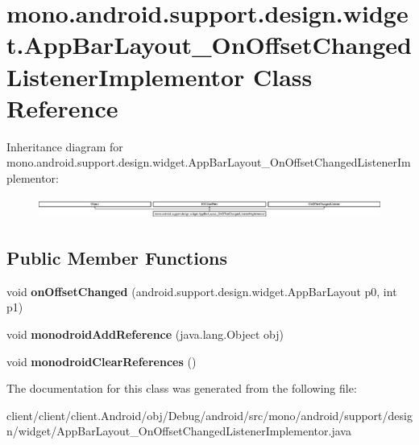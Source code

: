 \hypertarget{classmono_1_1android_1_1support_1_1design_1_1widget_1_1AppBarLayout__OnOffsetChangedListenerImplementor}{}\section{mono.\+android.\+support.\+design.\+widget.\+App\+Bar\+Layout\+\_\+\+On\+Offset\+Changed\+Listener\+Implementor Class Reference}
\label{classmono_1_1android_1_1support_1_1design_1_1widget_1_1AppBarLayout__OnOffsetChangedListenerImplementor}
Inheritance diagram for mono.\+android.\+support.\+design.\+widget.\+App\+Bar\+Layout\+\_\+\+On\+Offset\+Changed\+Listener\+Implementor\+:\begin{figure}[H]
\begin{center}
\leavevmode
\includegraphics[height=0.704403cm]{classmono_1_1android_1_1support_1_1design_1_1widget_1_1AppBarLayout__OnOffsetChangedListenerImplementor}
\end{center}
\end{figure}
\subsection*{Public Member Functions}
\begin{DoxyCompactItemize}
\item 
\hypertarget{classmono_1_1android_1_1support_1_1design_1_1widget_1_1AppBarLayout__OnOffsetChangedListenerImplementor_af1be42fc96cfda1bab1940dac3ed4b2c}{}void {\bfseries on\+Offset\+Changed} (android.\+support.\+design.\+widget.\+App\+Bar\+Layout p0, int p1)\label{classmono_1_1android_1_1support_1_1design_1_1widget_1_1AppBarLayout__OnOffsetChangedListenerImplementor_af1be42fc96cfda1bab1940dac3ed4b2c}

\item 
\hypertarget{classmono_1_1android_1_1support_1_1design_1_1widget_1_1AppBarLayout__OnOffsetChangedListenerImplementor_a94f7dac03362f2ea2f4b89d993e82cb6}{}void {\bfseries monodroid\+Add\+Reference} (java.\+lang.\+Object obj)\label{classmono_1_1android_1_1support_1_1design_1_1widget_1_1AppBarLayout__OnOffsetChangedListenerImplementor_a94f7dac03362f2ea2f4b89d993e82cb6}

\item 
\hypertarget{classmono_1_1android_1_1support_1_1design_1_1widget_1_1AppBarLayout__OnOffsetChangedListenerImplementor_a2bbedeb12ef96e9b75d0f95796625e8b}{}void {\bfseries monodroid\+Clear\+References} ()\label{classmono_1_1android_1_1support_1_1design_1_1widget_1_1AppBarLayout__OnOffsetChangedListenerImplementor_a2bbedeb12ef96e9b75d0f95796625e8b}

\end{DoxyCompactItemize}


The documentation for this class was generated from the following file\+:\begin{DoxyCompactItemize}
\item 
client/client/client.\+Android/obj/\+Debug/android/src/mono/android/support/design/widget/App\+Bar\+Layout\+\_\+\+On\+Offset\+Changed\+Listener\+Implementor.\+java\end{DoxyCompactItemize}
